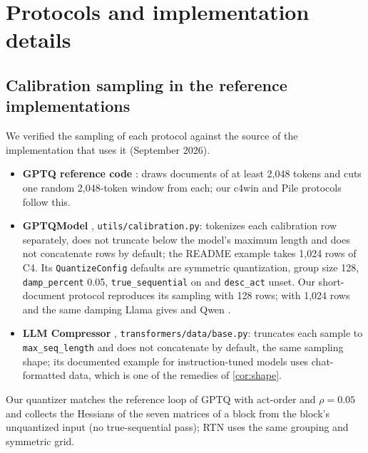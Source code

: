 \section{Protocols and implementation details}
\label{app:protocols}

\subsection{Calibration sampling in the reference implementations}
We verified the sampling of each protocol against the source of the implementation that uses it (September 2026).
\begin{itemize}
\item \textbf{GPTQ reference code} \citep{frantar2023gptq}: draws documents of at least 2,048 tokens and cuts one random 2,048-token window from each; our c4win and Pile protocols follow this.
\item \textbf{GPTQModel} \citep{gptqmodel}, \texttt{utils/calibration.py}: tokenizes each calibration row separately, does not truncate below the model's maximum length and does not concatenate rows by default; the README example takes 1,024 rows of C4. Its \texttt{QuantizeConfig} defaults are symmetric quantization, group size 128, \texttt{damp\_percent} 0.05, \texttt{true\_sequential} on and \texttt{desc\_act} unset. Our short-document protocol reproduces its sampling with 128 rows; with 1,024 rows and the same damping Llama gives \LgptqLibIF{} and Qwen \QgptqLibIF{}.
\item \textbf{LLM Compressor} \citep{llmcompressor}, \texttt{transformers/data/base.py}: truncates each sample to \texttt{max\_seq\_length} and does not concatenate by default, the same sampling shape; its documented example for instruction-tuned models uses chat-formatted data, which is one of the remedies of \cref{cor:shape}.
\end{itemize}
Our quantizer matches the reference loop of GPTQ with act-order and $\rho=0.05$ and collects the Hessians of the seven matrices of a block from the block's unquantized input (no true-sequential pass); RTN uses the same grouping and symmetric grid.

